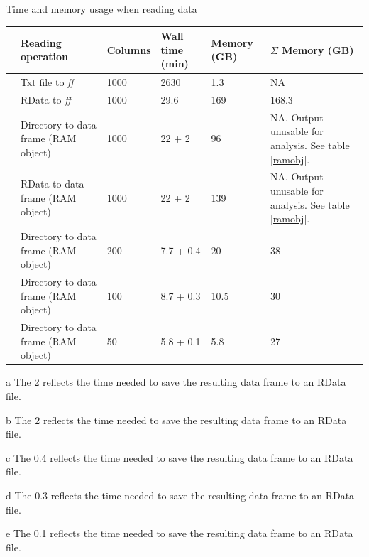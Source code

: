 \documentclass[a4paper,11pt]{article}
\newcounter{magicrownumbers}
\newcommand\rownumber{\stepcounter{magicrownumbers}\arabic{magicrownumbers}}
\begin{document}
\begin{center}
\begin{threeparttable}
  \caption{Time and memory usage when reading data}    
\label{large-ex-read}

  \begin{tabular}{lp{3.62cm}p{1.7cm}p{1.8cm}p{1.8cm}p{3.99cm}}
 
 \hline   \hline
& Reading operation&Columns & Wall time (min)& Memory (GB) & $\Sigma$ Memory (GB)\\
\hline

\rownumber&Txt file to \textit{ff} & 1000 & 2630 & 1.3 & NA\\ %
\rownumber&RData to \textit{ff} & 1000 & 29.6   &   169 & 168.3 \\
\rownumber&Directory to data frame (RAM object) & 1000 & 22 + 2\tnote{a} & 96 & NA. Output unusable for analysis. See table \ref{ramobj}. \\
\rownumber&RData to data frame (RAM object) & 1000 & 22 + 2\tnote{b} &  139 & NA. Output unusable for analysis. See table \ref{ramobj}. \\
\rownumber&Directory to data frame (RAM object) & 200 & 7.7 + 0.4\tnote{c} & 20 & 38 \\
\rownumber&Directory to data frame (RAM object) & 100 & 8.7 + 0.3\tnote{d} & 10.5 & 30 \\
\rownumber&Directory to data frame (RAM object) & 50 & 5.8 + 0.1\tnote{e} & 5.8 & 27 \\



\hline
   
  \end{tabular}

  \begin{tablenotes}
    {
      \footnotesize
    \item[a] The 2 reflects the time needed to save the resulting data frame to an RData file.
    \item[b] The 2 reflects the time needed to save the resulting data frame to an RData file.
    \item[c] The 0.4 reflects the time  needed to save the resulting data frame to an RData file.
    \item[d] The 0.3 reflects the time  needed to save the resulting data frame to an RData file.
    \item[e] The 0.1 reflects the time  needed to save the resulting data frame to an RData file.
    }
    \end{tablenotes}
\end{threeparttable}
\end{center}
\end{document}
